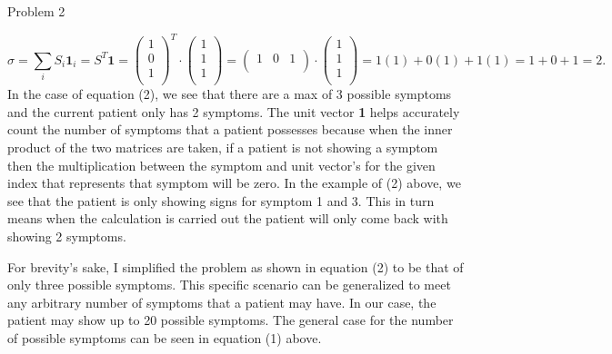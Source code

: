 \begin{problem}{Problem 2}
\begin{Highlight}
        \begin{equation}
            \sigma = \sum_{i} S_{i}\mathbf{1}_{i} = S^{T}\mathbf{1} = 
            \begin{pmatrix}
                1 \\
                0 \\
                1 \\
            \end{pmatrix}^{T}
            \cdot
            \begin{pmatrix}
                1 \\
                1 \\
                1 \\
            \end{pmatrix}
            =
            \begin{pmatrix}
                1 & 0 & 1 \\
            \end{pmatrix}
            \cdot
            \begin{pmatrix}
                1 \\
                1 \\
                1 \\
            \end{pmatrix}
            = 1(1) + 0(1) + 1(1) = 1 + 0 + 1 = 2.
        \end{equation}
        In the case of equation (2), we see that there are a max of 3 possible symptoms and the current patient only has 2 symptoms. The unit vector \textbf{1} helps
        accurately count the number of symptoms that a patient possesses because when the inner product of the two matrices are taken, if a patient is not showing a symptom
        then the multiplication between the symptom and unit vector's for the given index that represents that symptom will be zero. In the example of (2) above, we see that
        the patient is only showing signs for symptom 1 and 3. This in turn means when the calculation is carried out the patient will only come back with showing 2 symptoms.

        For brevity's sake, I simplified the problem as shown in equation (2) to be that of only three possible symptoms. This specific scenario can be generalized to meet 
        any arbitrary number of symptoms that a patient may have. In our case, the patient may show up to 20 possible symptoms. The general case for the number of possible 
        symptoms can be seen in equation (1) above.
    \end{Highlight}


\end{problem}
